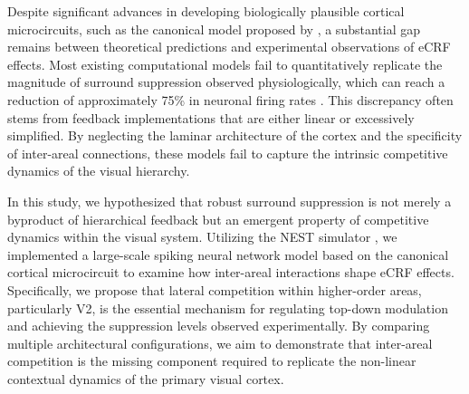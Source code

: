 Despite significant advances in developing biologically plausible cortical microcircuits, such as the canonical model proposed by \citet{Potjans2014}, a substantial gap remains between theoretical predictions and experimental observations of eCRF effects. Most existing computational models fail to quantitatively replicate the magnitude of surround suppression observed physiologically, which can reach a reduction of approximately 75\% in neuronal firing rates \citep{Busse2009,Dbrowska2021}. This discrepancy often stems from feedback implementations that are either linear or excessively simplified. By neglecting the laminar architecture of the cortex and the specificity of inter-areal connections, these models fail to capture the intrinsic competitive dynamics of the visual hierarchy.

In this study, we hypothesized that robust surround suppression is not merely a byproduct of hierarchical feedback but an emergent property of competitive dynamics within the visual system. Utilizing the NEST simulator \citep{Gewaltig2007}, we implemented a large-scale spiking neural network model based on the canonical cortical microcircuit to examine how inter-areal interactions shape eCRF effects. Specifically, we propose that lateral competition within higher-order areas, particularly V2, is the essential mechanism for regulating top-down modulation and achieving the suppression levels observed experimentally. By comparing multiple architectural configurations, we aim to demonstrate that inter-areal competition is the missing component required to replicate the non-linear contextual dynamics of the primary visual cortex.

